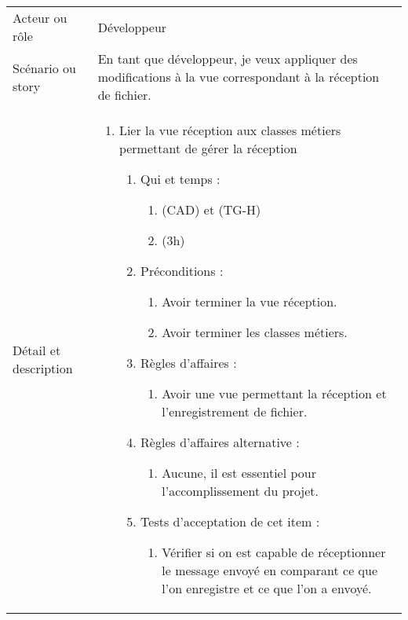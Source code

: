 \begin{longtable}{|l|p{}|}
\hline
    \rowcolor{Gray}
    \multicolumn{2}{|l|}{2} \\
\hline
    Acteur ou rôle & Développeur  \\
\hline
    Scénario ou story & En tant que développeur, je veux appliquer des modifications à la vue correspondant à la réception de fichier. \\
\hline
    Détail et description &
        \begin{enumerate}[label*=\arabic*.]
            \item   Lier la vue réception aux classes métiers permettant de gérer la réception
            \begin{enumerate}[label*=\arabic*.]
                    \item Qui et temps :
                    \begin{enumerate}[label*=\arabic*.]
                        \item (CAD) et (TG-H)
                        \item (3h)
                    \end{enumerate}
                    \item Préconditions :
                    \begin{enumerate}[label*=\arabic*.]
                        \item Avoir terminer la vue réception.
                        \item Avoir terminer les classes métiers.
                    \end{enumerate}
                    \item Règles d’affaires :
                    \begin{enumerate}[label*=\arabic*.]
                        \item Avoir une vue permettant la réception et l'enregistrement de fichier.
                    \end{enumerate}
                    \item Règles d’affaires alternative :
                    \begin{enumerate}[label*=\arabic*.]
                        \item Aucune, il est essentiel pour l'accomplissement du projet.
                    \end{enumerate}
                    \item Tests d'acceptation de cet item :
                    \begin{enumerate}[label*=\arabic*.]
                        \item Vérifier si on est capable de réceptionner le message envoyé en comparant ce que l'on enregistre et ce que l'on a envoyé.

\end{enumerate}
\end{enumerate}
\end{enumerate}
\end{longtable}
